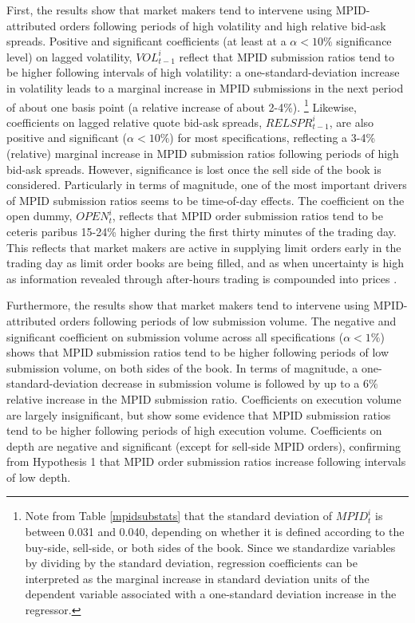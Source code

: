 \documentclass{article}
\begin{document}
First, the results show that market makers tend to intervene using MPID-attributed orders following periods of high volatility and high relative bid-ask spreads. Positive and significant coefficients (at least at a $\alpha<10\%$ significance level) on lagged volatility, $VOL_{t-1}^i$ reflect that MPID submission ratios tend to be higher following intervals of high volatility: a one-standard-deviation increase in volatility leads to a marginal increase in MPID submissions in the next period of about one basis point (a relative increase of about 2-4\%). \footnote{Note from Table \ref{mpidsubstats} that the standard deviation of $MPID_t^i$ is between 0.031 and 0.040, depending on whether it is defined according to the buy-side, sell-side, or both sides of the book. Since we standardize variables by dividing by the standard deviation, regression coefficients can be interpreted as the marginal increase in standard deviation units of the dependent variable associated with a one-standard deviation increase in the regressor.} Likewise, coefficients on lagged relative quote bid-ask spreads, $RELSPR_{t-1}^i$, are also positive and significant ($\alpha<10\%$) for most specifications, reflecting a 3-4\% (relative) marginal increase in MPID submission ratios following periods of high bid-ask spreads. However, significance is lost once the sell side of the book is considered. Particularly in terms of magnitude, one of the most important drivers of MPID submission ratios seems to be time-of-day effects. The coefficient on the open dummy, $OPEN_t^i$, reflects that MPID order submission ratios tend to be ceteris paribus 15-24\% higher during the first thirty minutes of the trading day. This reflects that market makers are active in supplying limit orders early in the trading day as limit order books are being filled, and as when uncertainty is high as information revealed through after-hours trading is compounded into prices \citep[see, e.g., ][]{foster1993variations,Gerety01071994}.

Furthermore, the results show that market makers tend to intervene using MPID-attributed orders following periods of low submission volume. The negative and significant coefficient on submission volume across all specifications ($\alpha<1\%$) shows that MPID submission ratios tend to be higher following periods of low submission volume, on both sides of the book. In terms of magnitude, a one-standard-deviation decrease in submission volume is followed by up to a $6\%$ relative increase in the MPID submission ratio. Coefficients on execution volume are largely insignificant, but show some evidence that MPID submission ratios tend to be higher following periods of high execution volume. Coefficients on depth are negative and significant (except for sell-side MPID orders), confirming from Hypothesis 1 that MPID order submission ratios increase following intervals of low depth.
\end{document}
